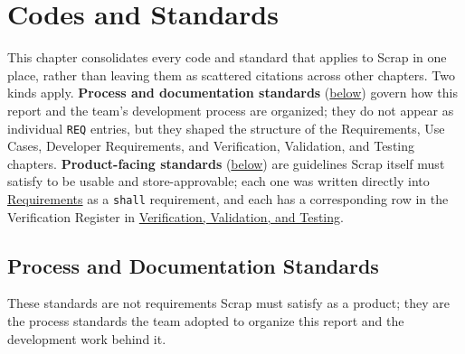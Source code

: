 \chapter{Codes and Standards}

\noindent This chapter consolidates every code and standard that applies to Scrap in one place, rather than leaving them as scattered citations across other chapters. Two kinds apply. \textbf{Process and documentation standards} (\hyperref[Section:ProcessStandards]{below}) govern how this report and the team's development process are organized; they do not appear as individual \texttt{REQ} entries, but they shaped the structure of the Requirements, Use Cases, Developer Requirements, and Verification, Validation, and Testing chapters. \textbf{Product-facing standards} (\hyperref[Section:ProductStandards]{below}) are guidelines Scrap itself must satisfy to be usable and store-approvable; each one was written directly into \hyperref[Chapter:Requirements]{Requirements} as a \texttt{shall} requirement, and each has a corresponding row in the Verification Register in \hyperref[Chapter:VerificationValidationTesting]{Verification, Validation, and Testing}.

\section{Process and Documentation Standards}\label{Section:ProcessStandards}

\noindent These standards are not requirements Scrap must satisfy as a product; they are the process standards the team adopted to organize this report and the development work behind it.

